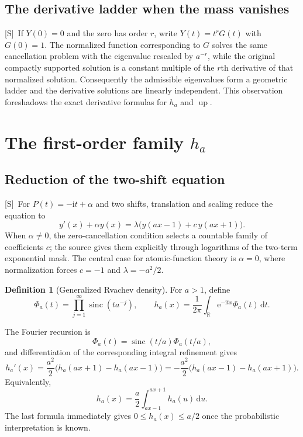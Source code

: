 \documentclass[11pt,oneside]{article}
\theoremstyle{definition}
\newtheorem{definition}[theorem]{Definition}
\theoremstyle{remark}
\newcommand{\R}{\mathbb R}
\newcommand{\Up}{\operatorname{up}}
\newcommand{\sinc}{\operatorname{sinc}}
\newcommand{\e}{\mathrm e}
\newcommand{\ii}{\mathrm i}
\newcommand{\dd}{\,\mathrm d}
\newcommand{\Smark}{\textcolor{sourceblue}{\textsf{[S]}}}
\begin{document}
\subsection{The derivative ladder when the mass vanishes}

\Smark\ If $Y(0)=0$ and the zero has order $r$, write $Y(t)=t^rG(t)$ with $G(0)=1$.
The normalized function corresponding to $G$ solves the same cancellation problem with the
eigenvalue rescaled by $a^{-r}$, while the original compactly supported solution is a constant
multiple of the $r$th derivative of that normalized solution.  Consequently the admissible
eigenvalues form a geometric ladder and the derivative solutions are linearly independent.
This observation foreshadows the exact derivative formulas for $h_a$ and $\Up$.

\section{The first-order family $h_a$}
\label{sec:ha-definition}

\subsection{Reduction of the two-shift equation}

\Smark\ For $P(t)=-\ii t+\alpha$ and two shifts, translation and scaling reduce the equation
to
\begin{equation}
 y'(x)+\alpha y(x)=\lambda\bigl(y(ax-1)+c\,y(ax+1)\bigr).
 \tag{S3.22}
 \label{eq:first-order-normal}
\end{equation}
When $\alpha\ne0$, the zero-cancellation condition selects a countable family of coefficients
$c$; the source gives them explicitly through logarithms of the two-term exponential mask.
The central case for atomic-function theory is $\alpha=0$, where normalization forces
$c=-1$ and $\lambda=-a^2/2$.

\begin{definition}[Generalized Rvachev density]
\label{def:ha}
For $a>1$, define
\begin{equation}
 \Phi_a(t)=\prod_{j=1}^{\infty}\sinc(ta^{-j}),
 \qquad
 h_a(x)=\frac1{2\pi}\int_{\R}\e^{-\ii tx}\Phi_a(t)\dd t.
 \tag{S3.24--S3.25}
 \label{eq:ha-Fourier}
\end{equation}
\end{definition}

The Fourier recursion is
\begin{equation}
 \Phi_a(t)=\sinc(t/a)\Phi_a(t/a),
 \tag{S3.28}
 \label{eq:ha-fourier-refinement}
\end{equation}
and differentiation of the corresponding integral refinement gives
\begin{equation}
 h_a'(x)=\frac{a^2}{2}\bigl(h_a(ax+1)-h_a(ax-1)\bigr)
       =-\frac{a^2}{2}\bigl(h_a(ax-1)-h_a(ax+1)\bigr).
 \tag{S3.23}
 \label{eq:ha-diffeq}
\end{equation}
Equivalently,
\begin{equation}
 h_a(x)=\frac a2\int_{ax-1}^{ax+1}h_a(u)\dd u.
 \label{eq:ha-integral-refinement}
\end{equation}
The last formula immediately gives $0\le h_a(x)\le a/2$ once the probabilistic
interpretation is known.
\end{document}
